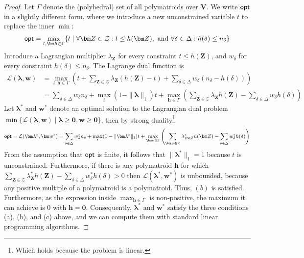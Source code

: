 \documentclass{theoretics}
\newcommand{\norm}[1]{\|#1\|}
\newcommand{\opt}{\text{\sf opt}}
\newcommand{\calL}{\mathcal L}
\newcommand{\calZ}{\mathcal Z}
\begin{document}
\begin{proof}
  Let $\Gamma$ denote the (polyhedral) set of all polymatroids over $\bm V$.
  We write $\opt$ in a slightly different form, where we introduce a new unconstrained variable
  $t$ to replace the inner $\min$:
  \begin{align} \opt = \max_{t, \bm h \in \Gamma}
      \{
        t \mid
        \forall {\bm Z} \in \calZ : t \leq h({\bm Z}),
        \text{ and }
        \forall \delta \in \Delta : h(\delta) \leq n_\delta
      \}
      \label{eq:max:min:problem:lp}
  \end{align}
  Introduce a Lagrangian multiplier $\lambda_{\bm Z}$ for every constraint $t \leq h({\bm Z})$,
  and $w_\delta$ for every constraint $h(\delta) \leq n_\delta$. The Lagrange dual
  function is
  \begin{align*}
      \calL(\bm \lambda, \bm w)
      &= \max_{t, \bm h \in \Gamma}
        \left( t + \sum_{{\bm Z} \in \calZ}\lambda_{\bm Z} (h({\bm Z})-t)
        + \sum_{\delta \in \Delta} w_\delta (n_\delta-h(\delta))
        \right) \\
      &= \sum_{\delta\in\Delta}w_\delta n_\delta
      + \max_{t} (1-\norm{\bm\lambda}_1)t
      + \max_{\bm h \in \Gamma} \left(
          \sum_{{\bm Z} \in \calZ} \lambda_{\bm Z}h({\bm Z}) -
          \sum_{\delta \in \Delta} w_\delta h(\delta)
        \right)
  \end{align*}
Let $\bm \lambda^*$ and $\bm w^*$ denote an optimal solution to the Lagrangian dual
problem
$\min \{ \calL(\bm \lambda, \bm w) \mid \bm\lambda \geq \bm 0, \bm w \geq \bm 0 \}$, then
by strong duality\footnote{Which holds because the problem is linear.}
\[
  \opt = \calL(\bm\lambda^*, \bm w^*)
      = \sum_{\delta\in\Delta}w^*_\delta n_\delta
      + \max_{t} (1-\norm{\bm\lambda^*}_1)t
      + \max_{\bm h \in \Gamma} \left(
          \sum_{{\bm Z} \in \calZ} \lambda^*_{\bm Z}h({\bm Z}) - \sum_{\delta \in \Delta} w^*_\delta h(\delta)
        \right)
\]
From the assumption that $\opt$ is finite, it follows that $\norm{\bm\lambda^*}_1=1$ because $t$
is unconstrained.
Furthermore, if there is any polymatroid $\bm h$ for which
$\sum_{{\bm Z} \in \calZ} \lambda^*_{\bm Z}h({\bm Z}) - \sum_{\delta \in \Delta} w^*_\delta h(\delta)
>0$ then
$\calL(\bm\lambda^*, \bm w^*)$ is unbounded, because any positive multiple of a polymatroid
is a polymatroid.
Thus, $(b)$ is satisfied. Furthermore, as the expression inside $\max_{\bm h \in \Gamma}$
is non-positive, the maximum it can achieve is $0$ with $\bm h = \bm 0$.
Consequently, $\bm\lambda^*$ and $\bm w^*$ satisfy the three conditions (a), (b), and (c)
above, and we can compute them with standard linear programming algorithms.
\end{proof}
\end{document}
